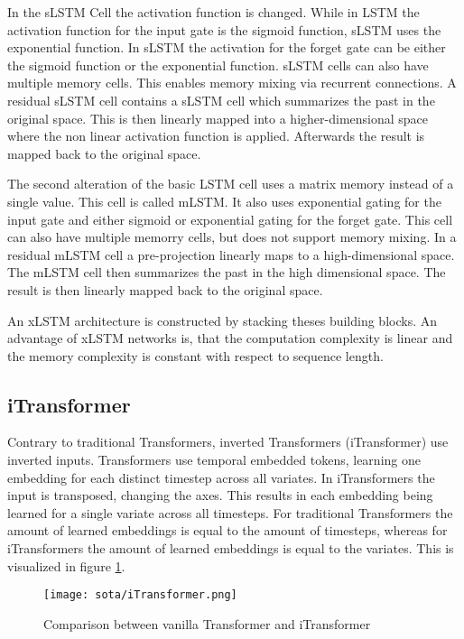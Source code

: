 \documentclass[class=scrbook, crop=false]{standalone}
\begin{document}
In the sLSTM Cell the activation function is changed. While in LSTM the activation function for the input gate is the sigmoid function, sLSTM uses the exponential function. In sLSTM the activation for the forget gate can be either the sigmoid function or the exponential function. sLSTM cells can also have multiple memory cells. This enables memory mixing via recurrent connections. A residual sLSTM cell contains a sLSTM  cell which summarizes the past in the original space. This is then linearly mapped into a higher-dimensional  space where the non linear activation function is applied. Afterwards the result is mapped back to the original space.

The second alteration of the basic LSTM cell uses a matrix memory instead of a single value. This cell is called mLSTM. It also uses exponential gating for the input gate and either sigmoid or exponential gating for the forget gate. This cell can also have multiple memorry cells, but does not support memory mixing. In a residual mLSTM cell a pre-projection linearly maps to a high-dimensional space. The mLSTM cell then summarizes the past in the high dimensional space. The result is then linearly mapped back to the original space.

An xLSTM architecture is constructed by stacking theses building blocks. An advantage of xLSTM networks is, that the computation complexity is linear and the memory complexity is constant with respect to sequence length. \cite{beckXLSTMExtendedLong2024}



\subsection{iTransformer}
\label{Section::iTransformer}

Contrary to traditional Transformers, inverted Transformers (iTransformer) use inverted inputs. Transformers use temporal embedded tokens, learning one embedding for each distinct timestep across all variates. In iTransformers the input is transposed, changing the axes. This results in each embedding being learned for a single variate across all timesteps. For traditional Transformers the amount of learned embeddings is equal to the amount of timesteps, whereas for iTransformers the amount of learned embeddings is equal to the variates. This is visualized in figure \ref{fig::iTransformer}.

\begin{figure}[ht]
            \centering
            \texttt{[image: sota/iTransformer.png]}
            \caption[Comparison between vanilla Transformer and iTransformer \cite{liuITransformerInvertedTransformers2023}]{Comparison between vanilla Transformer and iTransformer \cite{liuITransformerInvertedTransformers2023}}
            \label{fig::iTransformer}
 \end{figure}
\end{document}
